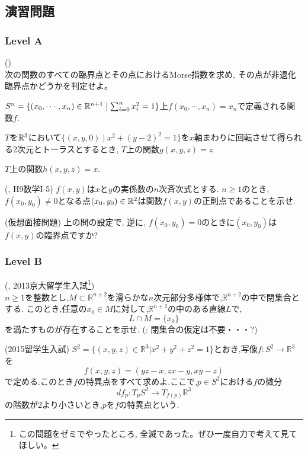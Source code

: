 \subsection{演習問題}
\subsubsection{Level A}
\begin{prob} ()\\
次の関数のすべての臨界点とその点におけるMorse指数を求め, その点が非退化臨界点かどうかを判定せよ。
\ben
\item $S^n = \{ (x_0,\cdots, x_n)\in \mathbb{R}^{n+1}\mid \sum_{i=0}^{n}x_i^2 = 1 \}$上$f(x_0,\cdots, x_n) = x_n$で定義される関数$f$.
\item $T$を$\mathbb{R}^3$において$\{ (x,y,0)\mid x^2+(y-2)^2=1\}$を$x$軸まわりに回転させて得られる2次元とトーラスとするとき, $T$上の関数$g(x,y,z) = z$
\item $T$上の関数$h(x,y,z)=x$.
\een
\end{prob}


\begin{prob} (, H9数学I-5)
$f(x,y)$は$x$と$y$の実係数の$n$次斉次式とする. $n\geq 1$のとき, $f(x_0,y_0) \neq 0$となる点$(x_0,y_0)\in \mathbb{R}^2$は関数$f(x,y)$の正則点であることを示せ.
\end{prob}

\begin{prob} (仮想面接問題) 上の問の設定で,
逆に, $f(x_0,y_0) = 0$のときに$(x_0,y_0)$は$f(x,y)$の臨界点ですか?
\end{prob}

\subsubsection{Level B}
\begin{prob} (, 2013京大留学生入試\footnote{この問題をゼミでやったところ, 全滅であった。ぜひ一度自力で考えて見てほしい。}) \label{prob:H25_F_4}\\
$n\geq 1$を整数とし,$M\subset \mathbb{R}^{n+2}$を滑らかな$n$次元部分多様体で,$\mathbb{R}^{n+2}$の中で閉集合とする.
このとき,任意の$x_0\in M$に対して,$\mathbb{R}^{n+2}$の中のある直線$L$で,
$$L\cap M=\{x_0\}$$
を満たすものが存在することを示せ. (: 閉集合の仮定は不要・・・?)
\end{prob}

\begin{prob} (2015留学生入試)\label{prob:H27_F_4}
$S^2=\{(x,y,z)\in\mathbb{R}^3|x^2+y^2+z^2=1\}$とおき,写像$f:S^2\to\mathbb{R}^3$を
$$f(x,y,z)=(yz-x,zx-y,xy-z)$$
で定める.このとき$f$の特異点をすべて求めよ.ここで,$p\in S^2$における$f$の微分
$$df_p:T_pS^2\to T_{f(p)}\mathbb{R}^3$$
の階数が2より小さいとき,$p$を$f$の特異点という.
\end{prob}

